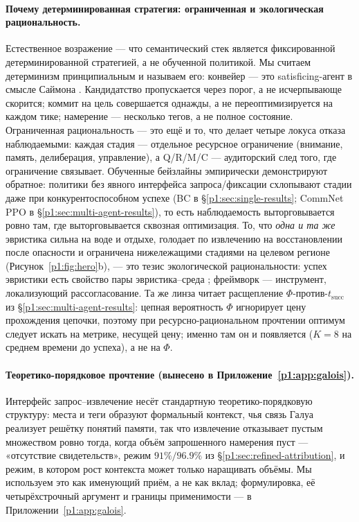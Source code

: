 \documentclass{article}
\begin{document}
\paragraph{Почему детерминированная стратегия: ограниченная и экологическая рациональность.}
Естественное возражение --- что семантический стек является фиксированной детерминированной стратегией, а не обученной политикой. Мы считаем детерминизм принципиальным и называем его: конвейер --- это satisficing-агент в смысле Саймона \citep{simon1955behavioral,simon1956rational}. Кандидатство пропускается через порог, а не исчерпывающе скорится; коммит на цель совершается однажды, а не переоптимизируется на каждом тике; намерение --- несколько тегов, а не полное состояние. Ограниченная рациональность --- это ещё и то, что делает четыре локуса отказа наблюдаемыми: каждая стадия --- отдельное ресурсное ограничение (внимание, память, делиберация, управление), а Q/R/M/C --- аудиторский след того, где ограничение связывает. Обученные бейзлайны эмпирически демонстрируют обратное: политики без явного интерфейса запроса/фиксации схлопывают стадии даже при конкурентоспособном успехе (BC в \S\ref{p1:sec:single-results}; CommNet PPO в \S\ref{p1:sec:multi-agent-results}), то есть наблюдаемость выторговывается ровно там, где выторговывается сквозная оптимизация. То, что \emph{одна и та же} эвристика сильна на воде и отдыхе, голодает по извлечению на восстановлении после опасности и ограничена нижележащими стадиями на целевом регионе (Рисунок~\ref{p1:fig:hero}b), --- это тезис экологической рациональности: успех эвристики есть свойство пары эвристика--среда \citep{simon1956rational,gigerenzer1996reasoning}; фреймворк --- инструмент, локализующий рассогласование. Та же линза читает расщепление $\Phi$-против-$t_{\mathrm{succ}}$ из \S\ref{p1:sec:multi-agent-results}: цепная вероятность $\Phi$ игнорирует цену прохождения цепочки, поэтому при ресурсно-рациональном прочтении \citep{lieder2020resource} оптимум следует искать на метрике, несущей цену; именно там он и появляется ($K{=}8$ на среднем времени до успеха), а не на $\Phi$.

\paragraph{Теоретико-порядковое прочтение (вынесено в Приложение~\ref{p1:app:galois}).}
Интерфейс запрос--извлечение несёт стандартную теоретико-порядковую структуру: места и теги образуют формальный контекст, чья связь Галуа реализует решётку понятий памяти, так что извлечение отказывает пустым множеством ровно тогда, когда объём запрошенного намерения пуст --- «отсутствие свидетельств», режим $91\%/96.9\%$ из \S\ref{p1:sec:refined-attribution}, и режим, в котором рост контекста может только наращивать объёмы. Мы используем это как именующий приём, а не как вклад; формулировка, её четырёхстрочный аргумент и границы применимости --- в Приложении~\ref{p1:app:galois}.
\end{document}
